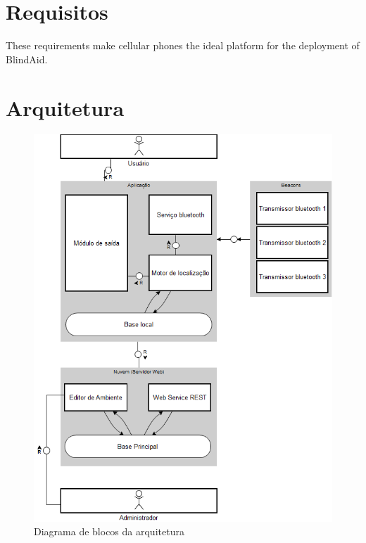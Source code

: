 \documentclass[english,brazilian]{UNISINOSmonografia}
\begin{document}
	\section{Requisitos}

These requirements make cellular phones the ideal platform for the deployment of BlindAid.


	\section{Arquitetura}

\FloatBarrier 
\begin{figure}
	\caption{Diagrama de blocos da arquitetura}
	\label{fig:arquitetura}
	\centering%
	\begin{minipage}{.8\textwidth}
		\includegraphics[width=\textwidth]{imgs/arquitetura.png}
	\end{minipage}
\end{figure}
\FloatBarrier
\end{document}
